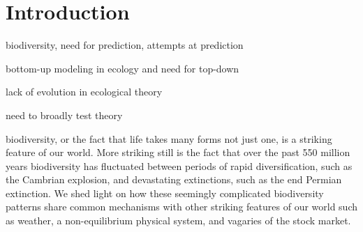 \chapter*{Introduction}

biodiversity, need for prediction, attempts at prediction

bottom-up modeling in ecology and need for top-down

lack of evolution in ecological theory

need to broadly test theory


biodiversity, or the
fact that life takes many forms not just one, is a striking feature of
our world. More striking still is the fact that over the past 550
million years biodiversity has fluctuated between periods of rapid
diversification, such as the Cambrian explosion, and devastating
extinctions, such as the end Permian extinction.  We shed light on how
these seemingly complicated biodiversity patterns share common
mechanisms with other striking features of our world such as weather,
a non-equilibrium physical system, and vagaries of the stock market.



